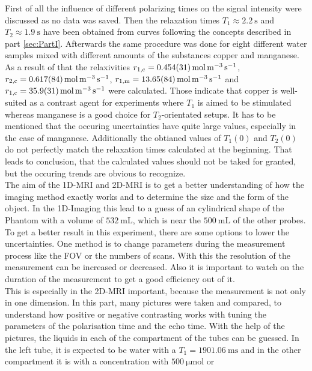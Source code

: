 First of all the influence of different polarizing times on the signal intensity were discussed as no data was saved. Then the relaxation times $T_1 \approx \SI{2.2}{\second}$ and $T_2 \approx \SI{1.9}{\second}$ have been obtained from curves following the concepts described in part \ref{sec:PartI}. Afterwards the same procedure was done for eight different water samples mixed with different amounts of the substances copper and manganese. As a result of that the relaxivities $r_{\text{1,c}} = \SI{0.454 \pm 0.031}{\mole \per \metre \tothe{3} \per \second}$, $r_{\text{2,c}} = \SI{0.617 \pm 0.084}{\mole \per \metre \tothe{3} \per \second}$, $r_{\text{1,m}} = \SI{13.65 \pm 0.84}{\mole \per \metre \tothe{3} \per \second}$ and $r_{\text{1,c}} = \SI{35.9 \pm 3.1}{\mole \per \metre \tothe{3} \per \second}$ were calculated. 
Those indicate that copper is well-suited as a contrast agent for experiments where $T_1$ is aimed to be stimulated whereas manganese is a good choice for $T_2$-orientated setups.
It has to be mentioned that the occuring uncertainties have quite large values, especially in the case of manganese.
Additionally the obtianed values of $T_1(0)$ and $T_2(0)$ do not perfectly match the relaxation times calculated at the beginning.
That leads to conclusion, that the calculated values should not be taked for granted, but the occuring trends are obvious to recognize.\\
The aim of the 1D-MRI and 2D-MRI is to get a better understanding of how the imaging method exactly works and to determine the size and the form of the object. In the 1D-Imaging this lead to a guess of an cylindrical shape of the Phantom with a volume of $\SI{532}{\milli\liter}$, which is near the $\SI{500}{\milli\liter}$ of the other probes. To get a better result in this experiment, there are some options to lower the uncertainties. One method is to change parameters during the measurement process like the FOV or the numbers of scans. With this the resolution of the measurement can be increased or decreased. Also it is important to watch on the duration of the measurement to get a good efficiency out of it. \\
This is especially in the 2D-MRI important, because the measurement is not only in one dimension. In this part, many pictures were taken and compared, to understand how positive or negative contrasting works with tuning the parameters of the polarisation time and the echo time. With the help of the pictures, the liquids in each of the compartment of the tubes can be guessed. In the left tube, it is expected to be water with a $T_1=\SI{1901,06}{\milli\s}$ and in the other compartment it is  with a concentration with $\SI{500}{\micro\mole}$ or 
